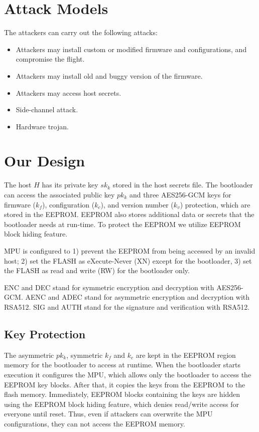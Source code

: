 \documentclass[11pt,oneside,onecolumn,letterpaper]{article}
\begin{document}
\section{Attack Models}

The attackers can carry out the following attacks:

\begin{itemize}
  \item Attackers may install custom or modified firmware and configurations, and compromise the flight.
  \item Attackers may install old and buggy version of the firmware.
  \item Attackers may access host secrets.
  \item Side-channel attack.
  \item Hardware trojan.
\end{itemize}


\section{Our Design}

The host $H$ has its private key $sk_k$ stored in the host secrets file.
The bootloader can access the associated public key $pk_k$ and three AES256-GCM keys for firmware ($k_f$), configuration ($k_c$), and version number ($k_v$) protection, which are stored in the EEPROM.
EEPROM also stores additional data or secrets that the bootloader needs at run-time.
To protect the EEPROM we utilize EEPROM block hiding feature.

MPU is configured to 1) prevent the EEPROM from being accessed by an invalid host; 2) set the FLASH as eXecute-Never (XN) except for the bootloader, 3) set the FLASH as read and write (RW) for the bootloader only. 

ENC and DEC stand for symmetric encryption and decryption with AES256-GCM.
AENC and ADEC stand for asymmetric encryption and decryption with RSA512.
SIG and AUTH stand for the signature and verification with RSA512.

\subsection{Key Protection}
The asymmetric $pk_k$, symmetric $k_f$ and $k_c$ are kept in the EEPROM region memory for the bootloader to access at runtime.
When the bootloader starts execution it configures the MPU, which allows only the bootloader to access the EEPROM key blocks.
After that, it copies the keys from the EEPROM to the flash memory.
Immediately, EEPROM blocks containing the keys are hidden using the EEPROM block hiding feature, which denies read/write access for everyone until reset.
Thus, even if attackers can overwrite the MPU configurations, they can not access the EEPROM memory.
\end{document}
